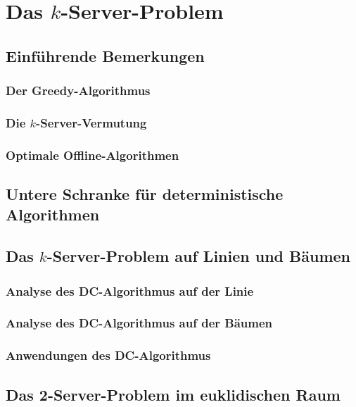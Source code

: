 \chapter{Das $k$-Server-Problem}


\section{Einführende Bemerkungen}

\subsection{Der Greedy-Algorithmus}

\subsection{Die $k$-Server-Vermutung}

\subsection{Optimale Offline-Algorithmen}


\section{Untere Schranke für deterministische Algorithmen}


\section{Das $k$-Server-Problem auf Linien und Bäumen}

\subsection{Analyse des DC-Algorithmus auf der Linie}

\subsection{Analyse des DC-Algorithmus auf der Bäumen}

\subsection{Anwendungen des DC-Algorithmus}


\section{Das 2-Server-Problem im euklidischen Raum}
